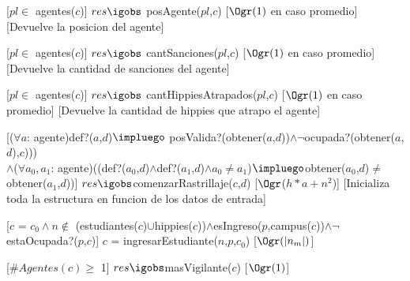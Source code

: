 \begin{Interfaz}
	[$pl \in$ agentes($c$)]
	{$res \igobs$ posAgente($pl$,$c$)}
	[$\Ogr(1)$ en caso promedio]
	[Devuelve la posicion del agente]

	[$pl \in$ agentes($c$)]
	{$res \igobs$ cantSanciones($pl$,$c$)}
	[$\Ogr(1)$ en caso promedio]
	[Devuelve la cantidad de sanciones del agente]
	
	[$pl \in$ agentes($c$)]
	{$res \igobs$ cantHippiesAtrapados($pl$,$c$)}
	[$\Ogr(1)$ en caso promedio]
	[Devuelve la cantidad de hippies que atrapo el agente]

	[($\forall a$: agente)def?($a$,$d$)$\impluego$ posValida?(obtener($a$,$d$))$\land \neg$ocupada?(obtener($a$,$d$),$c$)))\\
  $\land$($\forall a_0,a_1$: agente)((def?($a_0$,$d$)$\land$def?($a_1$,$d$)$\land a_0 \neq a_1$)$\impluego$obtener($a_0$,$d$)$\neq$obtener($a_1$,$d$))]
	{$res \igobs $comenzarRastrillaje($c$,$d$)}%
	[$\Ogr$($h*a + n^2$)]
	[Inicializa toda la estructura en funcion de los datos de entrada]

	[$c$ = $c_0 \land n \notin$ (estudiantes($c$)$\cup$hippies($c$))$\land$esIngreso($p$,campus($c$))$\land \neg$ estaOcupada?($p$,$c$)]
	{$c$ = ingresarEstudiante($n$,$p$,$c_0$)}
	[$\Ogr(|n_m|)$]
	
	[$\#Agentes(c) \geq$ 1]
	{$res \igobs$masVigilante($c$)}
	[$\Ogr(1)$]

\end{Interfaz}

